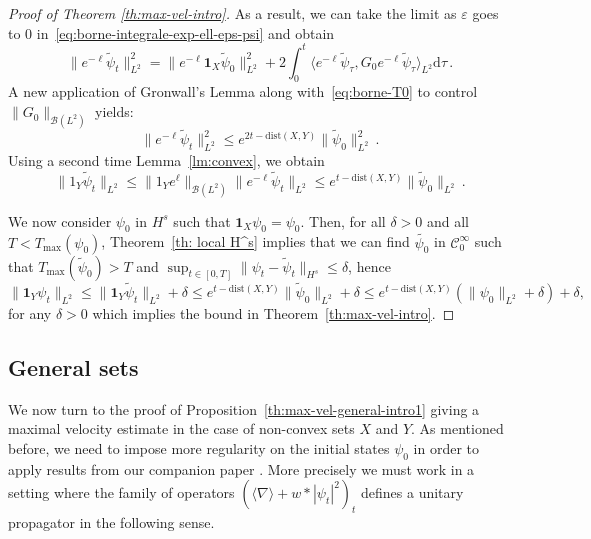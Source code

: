 \documentclass[12pt]{article}
\newcommand{\jnabla}{{\langle\nabla\rangle}}
\newcommand{\dXY}{{\mathrm{dist}(X,Y)}}
\theoremstyle{plain}
\newcommand{\diff}{\mathrm{d}}
\newcommand{\Tzero}{{G_0}}
\begin{document}
\begin{proof}[Proof of Theorem \ref{th:max-vel-intro}]
 As a result, we can take the limit as $\varepsilon$ goes to 0 in~\eqref{eq:borne-integrale-exp-ell-eps-psi} and obtain
\[
\|e^{-\ell}\tilde{\psi}_{t}\|_{L^{2}}^{2}=\|e^{-\ell}\mathbf{1}_{X}\tilde{\psi}_{0}\|_{L^{2}}^{2}+2\int_{0}^{t}\langle e^{-\ell}\tilde{\psi}_{\tau},\Tzero e^{-\ell}\tilde{\psi}_{\tau}\rangle_{L^{2}}\diff\tau\,.
\]
A new application of Gronwall's Lemma along with~\eqref{eq:borne-T0} to control $\|\Tzero\|_{\mathcal{B}(L^2)}$ yields:
\[
\|e^{-\ell}\tilde{\psi}_{t}\|_{L^{2}}^{2}\leq e^{2t-\dXY}\|\tilde{\psi}_{0}\|_{L^{2}}^{2}\,.
\]
Using a second time  Lemma~\ref{lm:convex}, we obtain
\[
\|1_{Y}\tilde{\psi}_{t}\|_{L^{2}}\leq \|1_{Y}e^\ell\|_{\mathcal{B}(L^{2})}  \|e^{-\ell}\tilde{\psi}_{t}\|_{L^{2}}\leq e^{t-\dXY}\|\tilde{\psi}_{0}\|_{L^{2}}\,.
\]

We now consider $\psi_{0}$ in $H^{s}$ such that $\boldsymbol{1}_{X}\psi_{0}=\psi_{0}$.
Then, for all $\delta>0$ and all $T<T_{\max}(\psi_{0})$, Theorem~\ref{th: local H^s} implies that we can find $\tilde{\psi_{0}}$ in $\mathcal{C}_{0}^{\infty}$
such that $T_{\max}(\tilde{\psi}_{0})>T$ and $\sup_{t\in[0,T]}\|\psi_{t}-\tilde{\psi}_{t}\|_{H^{s}}\leq\delta$,
hence 
\[
\|\boldsymbol{1}_{Y}\psi_{t}\|_{L^{2}}\leq\|\boldsymbol{1}_{Y}\tilde{\psi}_{t}\|_{L^{2}}+\delta\leq e^{t-\dXY}\|\tilde{\psi}_{0}\|_{L^{2}}+\delta\leq e^{t-\dXY}(\|\psi_{0}\|_{L^{2}}+\delta)+\delta,
\]
for any $\delta>0$ which implies the bound in Theorem~\ref{th:max-vel-intro}.
\end{proof}

\subsection{General sets}\label{subsec:general}

We now turn to the proof of Proposition~\ref{th:max-vel-general-intro1} giving a maximal velocity estimate in the case of non-convex sets $X$ and $Y$. As mentioned before, we need to impose more regularity on the initial states $\psi_0$ in order to apply results from our companion paper \cite{BFG2a}. More precisely we must work in a setting where the family of operators $(\jnabla +w*|\psi_t|^2)_t$ defines a unitary propagator in the following sense.
\end{document}
